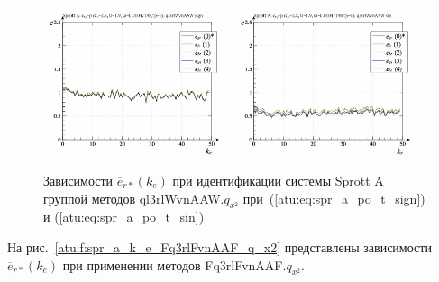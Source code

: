 \begin{figure}[htb!]
  \centerline{
    \includegraphics[width=0.49\textwidth]{p/cha/spr_a/ql3rlWvnAAW_x2/sprott_a_id-p_k_e_sign.png}
    \hfill
    \includegraphics[width=0.49\textwidth]{p/cha/spr_a/ql3rlWvnAAW_x2/sprott_a_id-p_k_e_sin.png}
  }
  \caption{Зависимости $\overline{e}_{r*}(k_e)$ при идентификации системы Sprott A группой методов ql3rlWvnAAW.$q_{x^2}$
   при~(\ref{atu:eq:spr_a_po_t_sign}) и (\ref{atu:eq:spr_a_po_t_sin})}
  \label{atu:f:spr_a_k_e_ql3rlWvnAAW_q_x2}
\end{figure}

На рис.~\ref{atu:f:spr_a_k_e_Fq3rlFvnAAF_q_x2} представлены зависимости
$\overline{e}_{r*}(k_e)$ при применении методов Fq3rlFvnAAF.$q_{x^2}$.

